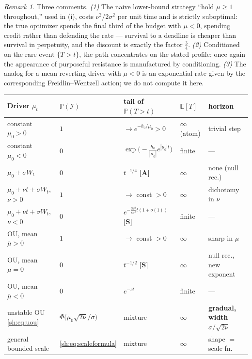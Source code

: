 \documentclass[11pt]{article}
\numberwithin{equation}{section}
\theoremstyle{plain}
\theoremstyle{definition}
\theoremstyle{remark}
\newtheorem{remark}[theorem]{Remark}
\newcommand{\E}{\mathbb{E}}
\newcommand{\PP}{\mathbb{P}}
\newcommand{\Imm}{\mathcal{I}}
\begin{document}
\begin{remark}\label{sh:rem:advdrift}
Three comments. \emph{(1)} The naive lower-bound strategy ``hold
$\mu\ge1$ throughout,'' used in (i), costs $\nu^2/2\sigma^2$ per unit time
and is strictly suboptimal: the true optimizer spends the final third of
the budget with $\mu<0$, spending credit rather than defending the rate ---
survival to a deadline is cheaper than survival in perpetuity, and the
discount is exactly the factor $\tfrac34$. \emph{(2)} Conditioned on the
rare event $\{T>t\}$, the path concentrates on the stated profile: once
again the appearance of purposeful resistance is manufactured by
conditioning. \emph{(3)} The analog for a mean-reverting driver with
$\bar\mu<0$ is an exponential rate given by the corresponding
Freidlin--Wentzell action; we do not compute it here.
\end{remark}

\begin{center}
\small
\begin{tabular}{@{}lllll@{}}
\toprule
\textbf{Driver} $\mu_t$ & $\PP(\Imm)$ & \textbf{tail of }$\PP(T>t)$ &
$\E[T]$ & \textbf{horizon}\\
\midrule
constant $\mu_0>0$ & $1$ & $\to e^{-h_0/\mu_0}>0$ & $\infty$ (atom) &
trivial step\\
constant $\mu_0<0$ & $0$ & $\exp\bigl(-\tfrac{h_0}{|\mu_0|}
e^{|\mu_0|t}\bigr)$ & finite & ---\\
$\mu_0+\sigma W_t$ & $0$ & $t^{-1/4}$ \textbf{[A]} & $\infty$ & none
(null rec.)\\
$\mu_0+\nu t+\sigma W_t$, $\nu>0$ & $1$ & $\to$ const $>0$ & $\infty$ &
dichotomy in $\nu$\\
$\mu_0+\nu t+\sigma W_t$, $\nu<0$ & $0$ &
$e^{-\frac{3\nu^2}{8\sigma^2}t(1+o(1))}$ \textbf{[S]} & finite & ---\\
OU, mean $\bar\mu>0$ & $1$ & $\to$ const $>0$ & $\infty$ & sharp in
$\bar\mu$\\
OU, mean $\bar\mu=0$ & $0$ & $t^{-1/2}$ \textbf{[S]} & $\infty$ & null
rec., new exponent\\
OU, mean $\bar\mu<0$ & $0$ & $e^{-ct}$ & finite & ---\\
unstable OU \eqref{sh:eq:uou} & $\Phi\bigl(\mu_0\sqrt{2\nu}/\sigma\bigr)$
& mixture & $\infty$ & \textbf{gradual, width }$\sigma/\sqrt{2\nu}$\\
general bounded scale & \eqref{sh:eq:scaleformula} & mixture & $\infty$ &
shape $=$ scale fn.\\
\bottomrule
\end{tabular}
\end{center}
\end{document}
